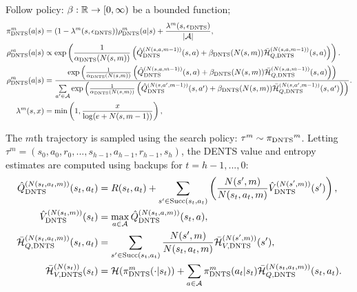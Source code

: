         Follow policy: 
         $\beta : \mathbb{R}\rightarrow [0,\infty)$ be a bounded function; 
        \begin{align}
            {\pi^{m}_{{\textnormal{DNTS}}}}(a|s) &= (1-{\lambda^{m}(s,{\epsilon_{{\textnormal{DNTS}}}})}){\rho^{m}_{{\textnormal{DNTS}}}}(a|s) + \frac{{\lambda^{m}(s,{\epsilon_{{\textnormal{DNTS}}}})}}{|\mathcal{A}|}, 
                \label{appeq:dents_search_policy}  \\
            {\rho^{m}_{{\textnormal{DNTS}}}}(a|s) &\propto \exp\left(\frac{1}{{\alpha_{{\textnormal{DNTS}}}}(N(s,m))}
                \left({\hat{Q}^{(N(s,a,m-1))}_{{\textnormal{DNTS}}}}(s,a) + {\beta_{{\textnormal{DNTS}}}}(N(s,m)){\bar{\mathcal{H}}^{(N(s,a,m-1))}_{Q,{\textnormal{DNTS}}}}(s,a) \right)\right). \\
            {\rho^{m}_{{\textnormal{DNTS}}}}(a|s) &= \frac{
                \exp\left(\frac{1}{{\alpha_{{\textnormal{DNTS}}}}(N(s,m))}\left(
                    {\hat{Q}^{(N(s,a,m-1))}_{{\textnormal{DNTS}}}}(s,a) + {\beta_{{\textnormal{DNTS}}}}(N(s,m)){\bar{\mathcal{H}}^{(N(s,a,m-1))}_{Q,{\textnormal{DNTS}}}}(s,a)   \right)\right)
                }{\sum\limits_{a'\in\mathcal{A}} \exp\left(\frac{1}{{\alpha_{{\textnormal{DNTS}}}}(N(s,m))}\left(
                    {\hat{Q}^{(N(s,a',m-1))}_{{\textnormal{DNTS}}}}(s,a') + {\beta_{{\textnormal{DNTS}}}}(N(s,m)){\bar{\mathcal{H}}^{(N(s,a',m-1))}_{Q,{\textnormal{DNTS}}}}(s,a')  \right)\right)}.  
                \label{appeq:full_rho} \\
            \lambda^m(s,x) &= \min\left(1, \frac{x}{\log(e+N(s,m-1))}\right), 
        \end{align}

        The $m$th trajectory is sampled using the search policy: $\tau^m \sim {\pi_{{\textnormal{DNTS}}}}^m$. Letting $\tau^m=(s_0,a_0,r_0,...,s_{h-1},a_{h-1},r_{h-1},s_{h})$, the DENTS value and entropy estimates are computed using backups for $t=h-1, ..., 0$: 
        \begin{align}
            {\hat{Q}^{(N(s_t,a_t,m))}_{{\textnormal{DNTS}}}}(s_t,a_t) &= 
                R(s_t,a_t) + \sum_{s' \in {\textnormal{Succ}(s_t,a_t)}} \left( 
                    \frac{N(s',m)}{N(s_t,a_t,m)} {\hat{V}^{(N(s',m))}_{{\textnormal{DNTS}}}}(s') \right), 
                \label{appeq:dp_q_backup} \\ 
            {\hat{V}^{(N(s_t,m))}_{{\textnormal{DNTS}}}}(s_t) &=\max_{a\in\mathcal{A}} {\hat{Q}^{(N(s_t,a,m))}_{{\textnormal{DNTS}}}}(s_t,a), 
                \label{appeq:dp_v_backup} \\
            {\bar{\mathcal{H}}^{(N(s_t,a_t,m))}_{Q,{\textnormal{DNTS}}}}(s_t,a_t) &= 
                \sum_{s'\in {\textnormal{Succ}(s_t,a_t)}} \frac{N(s',m)}{N(s_t,a_t,m)} {\bar{\mathcal{H}}^{(N(s',m))}_{V,{\textnormal{DNTS}}}}(s'), \\
            {\bar{\mathcal{H}}^{(N(s_t))}_{V,{\textnormal{DNTS}}}}(s_t) &= 
                \mathcal{H}({\pi^{m}_{{\textnormal{DNTS}}}}(\cdot | s_t)) 
                    + \sum_{a\in\mathcal{A}} {\pi^{m}_{{\textnormal{DNTS}}}}(a_t|s_t){\bar{\mathcal{H}}^{(N(s_t,a_t,m))}_{Q,{\textnormal{DNTS}}}}(s_t,a_t).
        \end{align}

